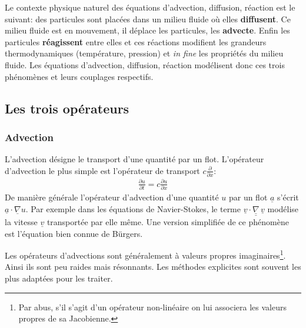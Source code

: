Le contexte physique naturel des équations d'advection, diffusion, réaction est le suivant:
des particules sont placées dans un milieu fluide où elles \textbf{diffusent}. Ce milieu fluide
est en mouvement, il déplace les particules, les \textbf{advecte}.
Enfin les particules \textbf{réagissent} entre elles et ces réactions modifient les grandeurs thermodynamiques (température, pression) et \textit{in fine} les propriétés
du milieu fluide.
Les équations d'advection, diffusion, réaction modélisent donc ces trois phénomènes et leurs couplages respectifs.

\subsection{Les trois opérateurs}
\subsubsection{Advection}
    L'advection désigne le transport d'une quantité par un flot. L'opérateur d'advection le plus simple est l'opérateur
    de transport $c \frac{\partial}{\partial x}$:
    \begin{align}\frac{\partial u}{\partial t} = c \frac{\partial u}{\partial x}\end{align}
    De manière générale l'opérateur d’advection d'une quantité $u$ par un flot $\underline a$ s'écrit $\underline a \cdot \underline{\nabla} u$.
    Par exemple dans les équations de Navier-Stokes, le terme $\underline{v} \cdot \underline{\underline \nabla} \, \underline{v}$ modélise 
    la vitesse $\underline v$ transportée par elle même. Une version simplifiée de ce phénomène est l'équation bien connue de Bürgers.\par 
    Les opérateurs d'advections sont généralement à valeurs propres imaginaires\footnote{Par abus, s'il s'agit d'un opérateur non-linéaire on lui associera les valeurs propres de sa Jacobienne.}.
    Ainsi ils sont peu raides mais résonnants. Les méthodes explicites sont souvent les plus adaptées pour les traiter.

